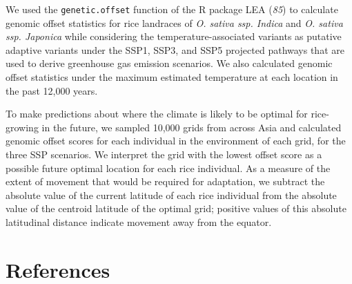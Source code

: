 \documentclass[
  letterpaper,
  DIV=11,
  numbers=noendperiod]{scrartcl}
\begin{document}
We used the \texttt{genetic.offset} function of the R package LEA
(\emph{85}) to calculate genomic offset statistics for rice landraces of
\emph{O. sativa ssp. Indica} and \emph{O. sativa ssp. Japonica} while
considering the temperature-associated variants as putative adaptive
variants under the SSP1, SSP3, and SSP5 projected pathways that are used
to derive greenhouse gas emission scenarios. We also calculated genomic
offset statistics under the maximum estimated temperature at each
location in the past 12,000 years.

To make predictions about where the climate is likely to be optimal for
rice-growing in the future, we sampled 10,000 grids from across Asia and
calculated genomic offset scores for each individual in the environment
of each grid, for the three SSP scenarios. We interpret the grid with
the lowest offset score as a possible future optimal location for each
rice individual. As a measure of the extent of movement that would be
required for adaptation, we subtract the absolute value of the current
latitude of each rice individual from the absolute value of the centroid
latitude of the optimal grid; positive values of this absolute
latitudinal distance indicate movement away from the equator.

\section{References}\label{references}
\end{document}
